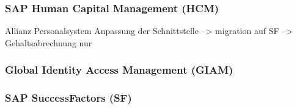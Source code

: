\subsubsection{SAP Human Capital Management (HCM)}
Allianz Personalsystem
Anpassung der Schnittstelle --> migration auf SF --> Gehaltsabrechnung nur
\subsubsection{Global Identity Access Management (GIAM)}
\subsubsection{SAP SuccessFactors (SF)}